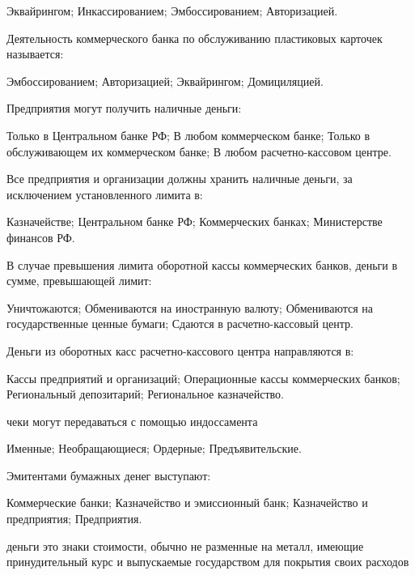 \documentclass[12pt, table]{exam}
\begin{document}
\begin{questions}
\begin{multicols}{2}
	 \begin{choices}
	 \choice Эквайрингом;
	 \CC Инкассированием;
	 \choice Эмбоссированием;
	 \choice Авторизацией.
	 \end{choices}
\question Деятельность коммерческого банка по обслуживанию пластиковых карточек называется:
	 \begin{choices}
	 \CC Эмбоссированием;
	 \choice Авторизацией;
	 \choice Эквайрингом;
	 \choice Домициляцией.
	 \end{choices}
\question Предприятия могут получить наличные деньги:
	 \begin{choices}
	 \choice Только в Центральном банке РФ;
	 \choice В любом коммерческом банке;
	 \choice Только в обслуживающем их коммерческом банке;
	 \CC В любом расчетно-кассовом центре.
	 \end{choices}
\question Все предприятия и организации должны хранить наличные деньги, за исключением установленного лимита в:
	 \begin{choices}
	 \CC Казначействе;
	 \choice Центральном банке РФ;
	 \choice Коммерческих банках;
	 \choice Министерстве финансов РФ.
	 \end{choices}
\question В случае превышения лимита оборотной кассы коммерческих банков, деньги в сумме, превышающей лимит:
	 \begin{choices}
	 \choice Уничтожаются;
	 \CC Обмениваются на иностранную валюту;
	 \choice Обмениваются на государственные ценные бумаги;
	 \choice Сдаются в расчетно-кассовый центр.
	 \end{choices}
\question Деньги из оборотных касс расчетно-кассового центра направляются в:
	 \begin{choices}
	 \choice Кассы предприятий и организаций;
	 \choice Операционные кассы коммерческих банков;
	 \CC Региональный депозитарий;
	 \choice Региональное казначейство.
	 \end{choices}
\question чеки могут передаваться с помощью индоссамента
	 \begin{choices}
	 \choice Именные;
	 \choice Необращающиеся;
	 \CC Ордерные;
	 \choice Предъявительские.
	 \end{choices}
\question Эмитентами бумажных денег выступают:
	 \begin{choices}
	 \CC Коммерческие банки;
	 \choice Казначейство и эмиссионный банк;
	 \choice Казначейство и предприятия;
	 \choice Предприятия.
	 \end{choices}
\question деньги  это знаки стоимости, обычно не разменные на металл, имеющие принудительный курс и выпускаемые государством для покрытия своих расходов

\end{multicols}
\end{questions}
\end{document}
